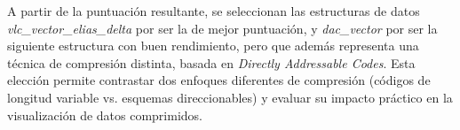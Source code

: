 A partir de la puntuación resultante, se seleccionan las estructuras de datos \textit{vlc\_vector\_elias\_delta} por ser la de mejor puntuación, y \textit{dac\_vector} por ser la siguiente estructura con buen rendimiento, pero que además representa una técnica de compresión distinta, basada en \textit{Directly Addressable Codes}. Esta elección permite contrastar dos enfoques diferentes de compresión (códigos de longitud variable vs. esquemas direccionables) y evaluar su impacto práctico en la visualización de datos comprimidos.
